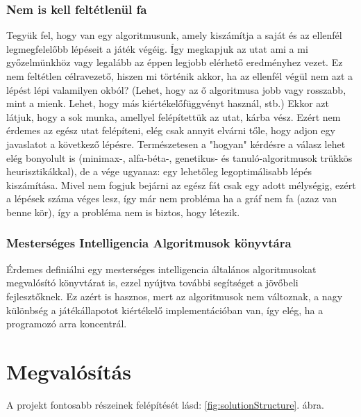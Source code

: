 \documentclass[twoside, a4paper, 12pt]{book}
\begin{document}
\subsection{Nem is kell feltétlenül fa}
Tegyük fel, hogy van egy algoritmusunk, amely kiszámítja a saját és az ellenfél legmegfelelőbb lépéseit a játék végéig. Így megkapjuk az utat ami a mi győzelmünkhöz vagy legalább az éppen legjobb elérhető eredményhez vezet. Ez nem feltétlen célravezető, hiszen mi történik akkor, ha az ellenfél végül nem azt a lépést lépi valamilyen okból? (Lehet, hogy az ő algoritmusa jobb vagy rosszabb, mint a mienk. Lehet, hogy más kiértékelőfüggvényt használ, stb.) Ekkor azt látjuk, hogy a sok munka, amellyel felépítettük az utat, kárba vész. Ezért nem érdemes az egész utat felépíteni, elég csak annyit elvárni tőle, hogy adjon egy javaslatot a következő lépésre. Természetesen a "hogyan" kérdésre a válasz lehet elég bonyolult is (minimax-, alfa-béta-, genetikus- és tanuló-algoritmusok trükkös heurisztikákkal), de a vége ugyanaz: egy lehetőleg legoptimálisabb lépés kiszámítása. Mivel nem fogjuk bejárni az egész fát csak egy adott mélységig, ezért a lépések száma véges lesz, így már nem probléma ha a gráf nem fa (azaz van benne kör), így a probléma nem is biztos, hogy létezik.

\subsection{Mesterséges Intelligencia Algoritmusok könyvtára}
Érdemes definiálni egy mesterséges intelligencia általános algoritmusokat megvalósító könyvtárat is, ezzel nyújtva további segítséget a jövőbeli fejlesztőknek. Ez azért is hasznos, mert az algoritmusok nem változnak, a nagy különbség a játékállapotot kiértékelő implementációban van, így elég, ha a programozó arra koncentrál.

\newpage
\chapter{Megvalósítás}
\noindent A projekt fontosabb részeinek felépítését lásd: \ref{fig:solutionStructure}. ábra.
\end{document}

